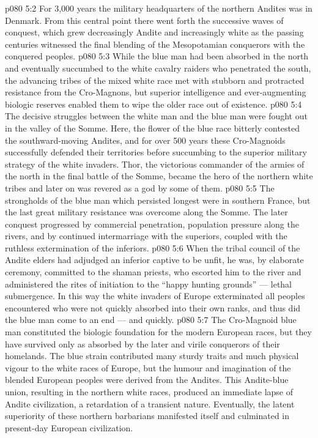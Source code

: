 \vs p080 5:2 For 3,000 years the military headquarters of the northern Andites was in Denmark. From this central point there went forth the successive waves of conquest, which grew decreasingly Andite and increasingly white as the passing centuries witnessed the final blending of the Mesopotamian conquerors with the conquered peoples.
\vs p080 5:3 \pc While the blue man had been absorbed in the north and eventually succumbed to the white cavalry raiders who penetrated the south, the advancing tribes of the mixed white race met with stubborn and protracted resistance from the Cro\hyp{}Magnons, but superior intelligence and ever\hyp{}augmenting biologic reserves enabled them to wipe the older race out of existence.
\vs p080 5:4 The decisive struggles between the white man and the blue man were fought out in the valley of the Somme. Here, the flower of the blue race bitterly contested the southward\hyp{}moving Andites, and for over 500 years these Cro\hyp{}Magnoids successfully defended their territories before succumbing to the superior military strategy of the white invaders. Thor, the victorious commander of the armies of the north in the final battle of the Somme, became the hero of the northern white tribes and later on was revered as a god by some of them.
\vs p080 5:5 \pc The strongholds of the blue man which persisted longest were in southern France, but the last great military resistance was overcome along the Somme. The later conquest progressed by commercial penetration, population pressure along the rivers, and by continued intermarriage with the superiors, coupled with the ruthless extermination of the inferiors.
\vs p080 5:6 When the tribal council of the Andite elders had adjudged an inferior captive to be unfit, he was, by elaborate ceremony, committed to the shaman priests, who escorted him to the river and administered the rites of initiation to the “happy hunting grounds” --- lethal submergence. In this way the white invaders of Europe exterminated all peoples encountered who were not quickly absorbed into their own ranks, and thus did the blue man come to an end --- and quickly.
\vs p080 5:7 \pc The Cro\hyp{}Magnoid blue man constituted the biologic foundation for the modern European races, but they have survived only as absorbed by the later and virile conquerors of their homelands. The blue strain contributed many sturdy traits and much physical vigour to the white races of Europe, but the humour and imagination of the blended European peoples were derived from the Andites. This Andite\hyp{}blue union, resulting in the northern white races, produced an immediate lapse of Andite civilization, a retardation of a transient nature. Eventually, the latent superiority of these northern barbarians manifested itself and culminated in present\hyp{}day European civilization.
